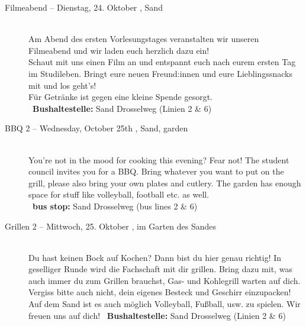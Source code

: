\begin{description}
\ifml
\else
	\item[Filmeabend -- Dienstag, 24. Oktober \YEAR, Sand]~\\%
	Am Abend des ersten Vorlesungstages veranstalten wir unseren Filmeabend und wir laden euch herzlich dazu ein!\\
	Schaut mit uns einen Film an und entspannt euch nach eurem ersten Tag im Studileben.
	Bringt eure neuen Freund:innen und eure Lieblingssnacks mit und los geht's!\\
	Für Getränke ist gegen eine kleine Spende gesorgt.\\
	~\textbf{Bushaltestelle:} Sand Drosselweg (Linien 2 \& 6)
\fi

\ifml
	\item[BBQ 2 -- Wednesday, October 25th \YEAR, Sand, garden]~\\%
	You're not in the mood for cooking this evening? Fear not!
    The student council invites you for a BBQ. Bring whatever you want to put on the grill,
    please also bring your own plates and cutlery. The garden has enough space for stuff like volleyball, football etc. as well.\\
	~\textbf{bus stop:} Sand Drosselweg (bus lines 2 \& 6)
\else
	\item[Grillen 2 -- Mittwoch, 25. Oktober \YEAR, im Garten des Sandes]~\\%
	Du hast keinen Bock auf Kochen? Dann bist du hier genau richtig! In geselliger Runde wird die Fachschaft mit dir grillen.
	Bring dazu mit, was auch immer du zum Grillen brauchst, Gas- und Kohlegrill warten auf dich. Vergiss bitte auch nicht, dein eigenes Besteck und Geschirr einzupacken!\\
	Auf dem Sand ist es auch möglich Volleyball, Fußball, usw. zu spielen. Wir freuen uns auf dich!
	~\textbf{Bushaltestelle:} Sand Drosselweg (Linien 2 \& 6)
\fi


\end{description}
